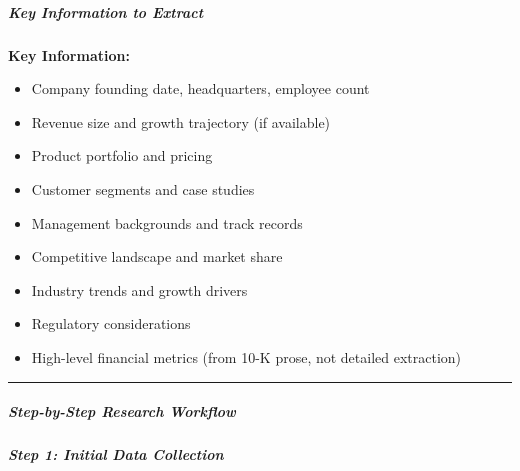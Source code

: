 \documentclass[11pt]{article}
\begin{document}
\subparagraph{Key Information to Extract}\mbox{}\par

\textbf{Key Information:}

\begin{itemize}[leftmargin=*,itemsep=2pt,topsep=2pt]
\item {} Company founding date, headquarters, employee count
\item {} Revenue size and growth trajectory (if available)
\item {} Product portfolio and pricing
\item {} Customer segments and case studies
\item {} Management backgrounds and track records
\item {} Competitive landscape and market share
\item {} Industry trends and growth drivers
\item {} Regulatory considerations
\item {} High-level financial metrics (from 10-K prose, not detailed extraction)
\end{itemize}

\vspace{0.5em}\hrule\vspace{0.5em}

\subparagraph{Step-by-Step Research Workflow}\mbox{}\par

\subparagraph{Step 1: Initial Data Collection}\mbox{}\par
\end{document}
